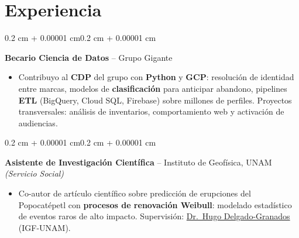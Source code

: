 \documentclass[10pt, letterpaper]{article}
\newenvironment{highlights}{
    \begin{itemize}[topsep=0 cm,parsep=0.02 cm,partopsep=0pt,itemsep=0pt,leftmargin=0.4 cm + 10pt]
}{\end{itemize}}
\newenvironment{onecolentry}{
    \begin{adjustwidth}{0.2 cm + 0.00001 cm}{0.2 cm + 0.00001 cm}
}{\end{adjustwidth}}
\let\hrefWithoutArrow\href
\renewcommand{\href}[2]{\hrefWithoutArrow{#1}{\ifthenelse{\equal{#2}{}}{ }{#2 }\raisebox{.15ex}{\footnotesize \faExternalLink*}}}
\begin{document}
    \section{Experiencia}
        \begin{onecolentry}
            \textbf{Becario Ciencia de Datos} -- Grupo Gigante
            \begin{highlights}
                \item Contribuyo al \textbf{CDP} del grupo con \textbf{Python} y \textbf{GCP}: resolución de identidad entre marcas, modelos de \textbf{clasificación} para anticipar abandono, pipelines \textbf{ETL} (BigQuery, Cloud SQL, Firebase) sobre millones de perfiles. Proyectos transversales: análisis de inventarios, comportamiento web y activación de audiencias.
            \end{highlights}
            \end{onecolentry}

        \vspace{0.02 cm}

        \begin{onecolentry}
            \textbf{Asistente de Investigación Científica} -- Instituto de Geofísica, UNAM \textit{(Servicio Social)}
            \begin{highlights}
                \item Co-autor de artículo científico sobre predicción de erupciones del Popocatépetl con \textbf{procesos de renovación Weibull}: modelado estadístico de eventos raros de alto impacto. Supervisión: \hrefWithoutArrow{https://scholar.google.com/citations?user=lDD0DZQAAAAJ}{Dr.\ Hugo Delgado-Granados} (IGF-UNAM).
            \end{highlights}
            \end{onecolentry}
\end{document}
